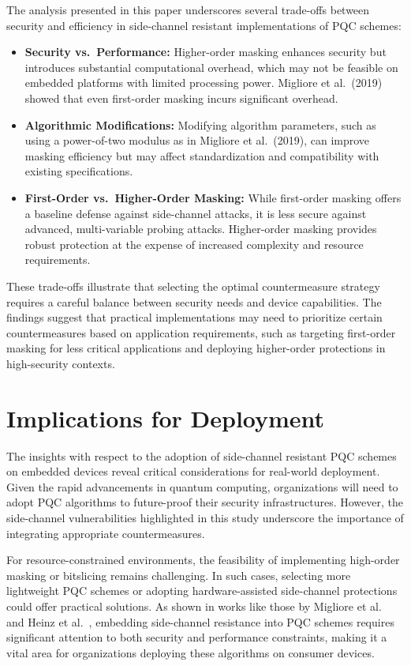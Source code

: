 The analysis presented in this paper underscores several trade-offs between security and efficiency in side-channel resistant implementations of \ac{PQC} schemes:

\begin{itemize}
    \item \textbf{Security vs.\ Performance:} Higher-order masking enhances security but introduces substantial computational overhead, which may not be feasible on embedded platforms with limited processing power. Migliore et al.\ (2019) showed that even first-order masking incurs significant overhead.
    \item \textbf{Algorithmic Modifications:} Modifying algorithm parameters, such as using a power-of-two modulus as in Migliore et al.\ (2019), can improve masking efficiency but may affect standardization and compatibility with existing specifications.
    \item \textbf{First-Order vs.\ Higher-Order Masking:} While first-order masking offers a baseline defense against side-channel attacks, it is less secure against advanced, multi-variable probing attacks. Higher-order masking provides robust protection at the expense of increased complexity and resource requirements.
\end{itemize}

These trade-offs illustrate that selecting the optimal countermeasure strategy requires a careful balance between security needs and device capabilities. The findings suggest that practical implementations may need to prioritize certain countermeasures based on application requirements, such as targeting first-order masking for less critical applications and deploying higher-order protections in high-security contexts.

\section{Implications for Deployment}

The insights with respect to the adoption of side-channel resistant \ac{PQC} schemes on embedded devices reveal critical considerations for real-world deployment. Given the rapid advancements in quantum computing, organizations will need to adopt \ac{PQC} algorithms to future-proof their security infrastructures. However, the side-channel vulnerabilities highlighted in this study underscore the importance of integrating appropriate countermeasures.

For resource-constrained environments, the feasibility of implementing high-order masking or bitslicing remains challenging. In such cases, selecting more lightweight \ac{PQC} schemes or adopting hardware-assisted side-channel protections could offer practical solutions. As shown in works like those by Migliore et al.\ \cite{Migliore19} and Heinz et al.\ \cite{Heinz20}, embedding side-channel resistance into \ac{PQC} schemes requires significant attention to both security and performance constraints, making it a vital area for organizations deploying these algorithms on consumer devices.

